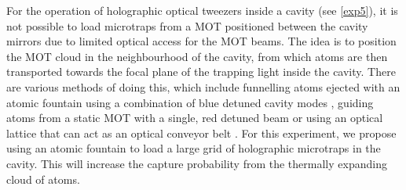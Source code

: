 \documentclass[../Thesis-IJspeert.tex]{subfiles}
\begin{document}
For the operation of holographic optical tweezers inside a cavity (see \autoref{exp5}), it is not possible to load microtraps from a MOT positioned between the cavity mirrors due to limited optical access for the MOT beams. The idea is to position the MOT cloud in the neighbourhood of the cavity, from which atoms are then transported towards the focal plane of the trapping light inside the cavity. There are various methods of doing this, which include funnelling atoms ejected with an atomic fountain using a combination of blue detuned cavity modes \cite{Puppe2007}, guiding atoms from a static MOT with a single, red detuned beam \cite{Numann2005} or using an optical lattice that can act as an optical conveyor belt \cite{Gallego2018,Schrader2001}. For this experiment, we propose using an atomic fountain to load a large grid of holographic microtraps in the cavity. This will increase the capture probability from the thermally expanding cloud of atoms.
\end{document}
